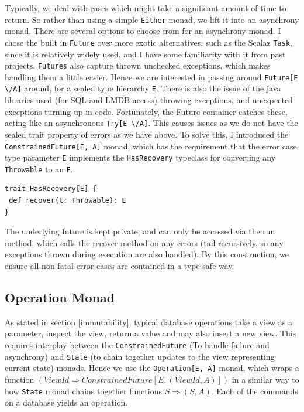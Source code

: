 \documentclass[12pt,a4paper,twoside,openright]{report}
\newcommand\codeName[1]{\texttt{#1}}
\newcommand\either[0]{\textbackslash/}
\renewcommand{\baselinestretch}{1.1}    %
\begin{document}
Typically, we deal with cases which might take a significant amount of time to return. So rather than using a simple \codeName{Either} monad, we lift it into an asynchrony monad. There are several options to choose from for an asynchrony monad. I chose the built in \codeName{Future} over more exotic alternatives, such as the Scalaz \codeName{Task}, since it is relatively widely used, and I have some familiarity with it from past projects. \codeName{Futures} also capture thrown unchecked exceptions, which makes handling them a little easier. Hence we are interested in passing around \codeName{Future[E \either A]} around, for a sealed type hierarchy \codeName{E}. There is also the issue of the java libraries used (for SQL and LMDB access) throwing exceptions, and unexpected exceptions turning up in code. Fortunately, the  Future container catches these, acting like an asynchronous \codeName{Try[E \either A]}. This causes issues as we do not have the sealed trait property of errors as we have above. To solve this, I introduced the \codeName{ConstrainedFuture[E, A]} monad, which has the requirement that the error case type parameter \codeName{E} implements the \codeName{HasRecovery} typeclass for converting any \codeName{Throwable} to an \codeName{E}.

\renewcommand{\baselinestretch}{0.8}
\begin{framed}
	\begin{verbatim}
trait HasRecovery[E] {
 def recover(t: Throwable): E
}
	\end{verbatim}
\end{framed}
\renewcommand{\baselinestretch}{1.1}

The underlying future is kept private, and can only be accessed via the run method, which calls the recover method on any errors (tail recursively, so any exceptions thrown during execution are also handled). By this construction, we ensure all non-fatal error cases are contained in a type-safe way.

	\subsection{Operation Monad}
	As stated in section \ref{immutability}, typical database operations take a view as a parameter, inspect the view, return a value and may also insert a new view. This requires interplay between the \codeName{ConstrainedFuture} (To handle failure and asynchrony) and \codeName{State} (to chain together updates to the view representing current state) monads. Hence we use the \codeName{Operation[E, A]} monad, which wraps a function \codeName{$(ViewId \Rightarrow ConstrainedFuture[E, (ViewId, A)])$} in a similar way to how \codeName{State} monad chains together functions \codeName{$S \Rightarrow (S, A)$}. Each of the commands on a database yields an operation.
\end{document}
